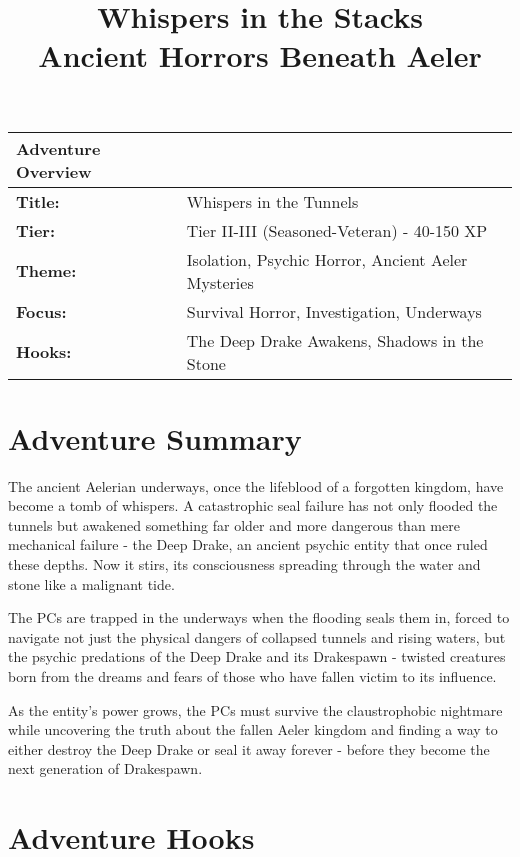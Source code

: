 \documentclass[11pt]{article}
\title{\Huge\textbf{Whispers in the Stacks}\\
\large{Ancient Horrors Beneath Aeler}}
\author{}
\date{}
\begin{document}
\maketitle

\begin{center}
\begin{tabular}{|p{2.5cm}|p{12cm}|}
\hline
\textbf{Adventure Overview} & \\
\hline
\textbf{Title:} & Whispers in the Tunnels \\
\textbf{Tier:} & Tier II-III (Seasoned-Veteran) - 40-150 XP \\
\textbf{Theme:} & Isolation, Psychic Horror, Ancient Aeler Mysteries \\
\textbf{Focus:} & Survival Horror, Investigation, Underways \\
\textbf{Hooks:} & The Deep Drake Awakens, Shadows in the Stone \\
\hline
\end{tabular}
\end{center}

\section{Adventure Summary}

The ancient Aelerian underways, once the lifeblood of a forgotten kingdom, have become a tomb of whispers. A catastrophic seal failure has not only flooded the tunnels but awakened something far older and more dangerous than mere mechanical failure - the Deep Drake, an ancient psychic entity that once ruled these depths. Now it stirs, its consciousness spreading through the water and stone like a malignant tide.

The PCs are trapped in the underways when the flooding seals them in, forced to navigate not just the physical dangers of collapsed tunnels and rising waters, but the psychic predations of the Deep Drake and its Drakespawn - twisted creatures born from the dreams and fears of those who have fallen victim to its influence.

As the entity's power grows, the PCs must survive the claustrophobic nightmare while uncovering the truth about the fallen Aeler kingdom and finding a way to either destroy the Deep Drake or seal it away forever - before they become the next generation of Drakespawn.

\section{Adventure Hooks}
\end{document}
